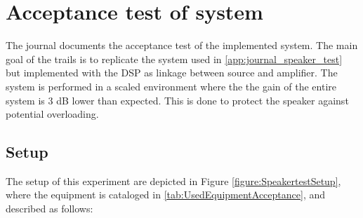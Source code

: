 \chapter{Acceptance test of system}\label{app:acceptance_test}

The journal documents the acceptance test of the implemented system. The main goal of the trails is to replicate the system used in \autoref{app:journal_speaker_test} but implemented with the DSP as linkage between source and amplifier. The system is performed in a scaled environment where the the gain of the entire system is 3 dB lower than expected. This is done to protect the speaker against potential overloading.



\section{Setup}

The setup of this experiment are depicted in Figure \ref{figure:SpeakertestSetup}, where the equipment is cataloged in \autoref{tab:UsedEquipmentAcceptance}, and described as follows:

